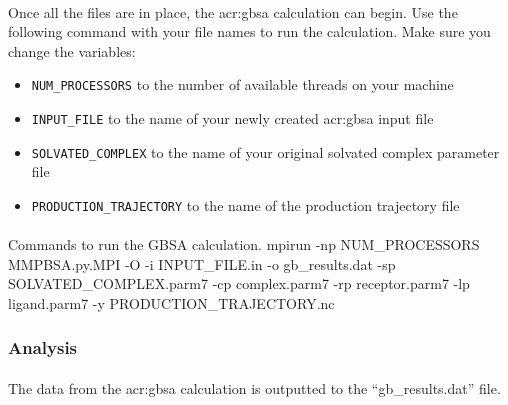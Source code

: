     \paragraph{}
    Once all the files are in place, the \gls{acr:gbsa} calculation can begin. Use the following command with your file names to run the calculation. Make sure you change the variables: 
    \begin{itemize}
        \item \texttt{NUM\_PROCESSORS} to the number of available threads on your machine
        \item \texttt{INPUT\_FILE} to the name of your newly created \gls{acr:gbsa} input file
        \item \texttt{SOLVATED\_COMPLEX} to the name of your original solvated complex parameter file
        \item \texttt{PRODUCTION\_TRAJECTORY} to the name of the production trajectory file
    \end{itemize}

    \paragraph{}

    \begin{bashcmd}[label=listing:gbsa-run]{Commands to run the GBSA calculation.}
    mpirun -np NUM_PROCESSORS MMPBSA.py.MPI -O -i INPUT_FILE.in -o gb_results.dat -sp SOLVATED_COMPLEX.parm7 -cp complex.parm7 -rp receptor.parm7 -lp ligand.parm7 -y PRODUCTION_TRAJECTORY.nc
    \end{bashcmd}

    \subsubsection{Analysis}
    \paragraph{}
    The data from the \gls{acr:gbsa} calculation is outputted to the \enquote{gb\_results.dat} file.